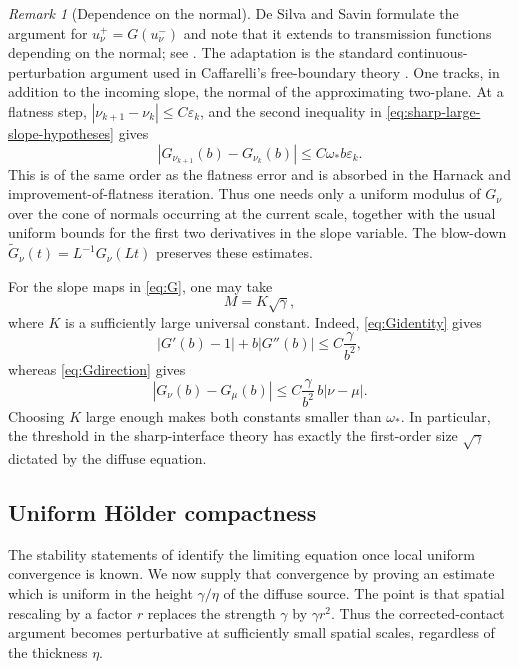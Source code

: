 \documentclass[11pt,letterpaper]{amsart}
\numberwithin{equation}{section}
\theoremstyle{definition}
\theoremstyle{remark}
\newtheorem{remark}[theorem]{Remark}
\begin{document}
\begin{remark}[Dependence on the normal]
De Silva and Savin formulate the argument for
$u_\nu^+=G(u_\nu^-)$ and note that it extends to transmission functions
depending on the normal; see \cite[Section~3.2]{DeSilvaSavin}.  The
adaptation is the standard continuous-perturbation argument used in
Caffarelli's free-boundary theory
\cite{CaffarelliI,CaffarelliII,CaffarelliIII}.  One tracks, in addition to the incoming
slope, the normal of the approximating two-plane.  At a flatness step,
$|\nu_{k+1}-\nu_k|\leq C\varepsilon_k$, and the second inequality in
\eqref{eq:sharp-large-slope-hypotheses} gives
$$
|G_{\nu_{k+1}}(b)-G_{\nu_k}(b)|
\leq C\omega_*b\varepsilon_k.
$$
This is of the same order as the flatness error and is absorbed in the
Harnack and improvement-of-flatness iteration.  Thus one needs only a
uniform modulus of $G_\nu$ over the cone of normals occurring at the current
scale, together with the usual uniform bounds for the first two derivatives
in the slope variable.  The blow-down
$\widetilde G_\nu(t)=L^{-1}G_\nu(Lt)$ preserves these estimates.
\end{remark}

For the slope maps in \eqref{eq:G}, one may take
\begin{equation}\label{eq:natural-large-slope-threshold}
M=K\sqrt\gamma,
\end{equation}
where $K$ is a sufficiently large universal constant. Indeed,
\eqref{eq:Gidentity} gives
$$
|G'(b)-1|+b|G''(b)|
\leq
C\frac{\gamma}{b^2},
$$
whereas \eqref{eq:Gdirection} gives
$$
|G_\nu(b)-G_\mu(b)|
\leq
C\frac{\gamma}{b^2}\,b|\nu-\mu|.
$$
Choosing $K$ large enough makes both constants smaller than $\omega_*$. In
particular, the threshold in the sharp-interface theory has exactly the
first-order size $\sqrt\gamma$ dictated by the diffuse equation.

\subsection{Uniform H\"older compactness}

The stability statements of 
identify the limiting equation once local uniform convergence is known.  We
now supply that convergence by proving an estimate which is uniform in the
height $\gamma/\eta$ of the diffuse source.  The point is that spatial
rescaling by a factor $r$ replaces the strength $\gamma$ by $\gamma r^2$.
Thus the corrected-contact argument becomes perturbative at sufficiently
small spatial scales, regardless of the thickness $\eta$.
\end{document}
